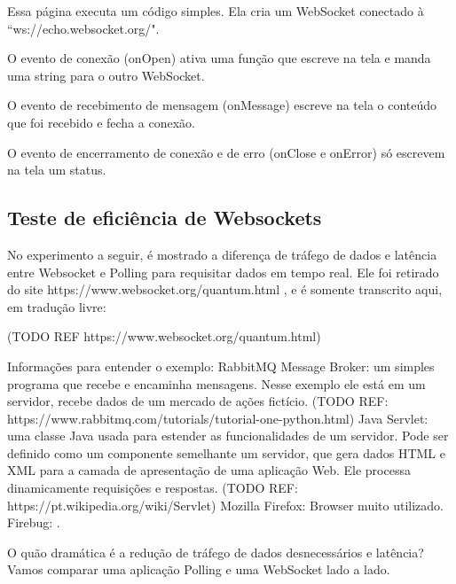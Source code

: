 \documentclass[a4paper,12pt]{article}
\begin{document}
Essa página executa um código simples. Ela cria um WebSocket conectado à “ws://echo.websocket.org/".

O evento de conexão (onOpen) ativa uma função que escreve na tela e manda uma string para o outro WebSocket.

O evento de recebimento de mensagem (onMessage) escreve na tela o conteúdo que foi recebido e fecha a conexão.

O evento de encerramento de conexão e de erro (onClose e onError) só escrevem na tela um status.





\subsection{Teste de eficiência de Websockets}


No experimento a seguir, é mostrado a diferença de tráfego de dados e latência entre Websocket e Polling para requisitar dados em tempo real. Ele foi retirado do site https://www.websocket.org/quantum.html , e é somente transcrito aqui, em tradução livre:

(TODO REF https://www.websocket.org/quantum.html)


Informações para entender o exemplo:
RabbitMQ Message Broker: um simples programa que recebe e encaminha mensagens. Nesse exemplo ele está em um servidor, recebe dados de um mercado de ações fictício. (TODO REF: https://www.rabbitmq.com/tutorials/tutorial-one-python.html)
Java Servlet: uma classe Java usada para estender as funcionalidades de um servidor. Pode ser definido como um componente semelhante um servidor, que gera dados HTML e XML para a camada de apresentação de uma aplicação Web. Ele processa dinamicamente requisições e respostas. (TODO REF: https://pt.wikipedia.org/wiki/Servlet)
Mozilla Firefox: Browser muito utilizado.
Firebug: .

O quão dramática é a redução de tráfego de dados desnecessários e latência? Vamos comparar uma aplicação Polling e uma WebSocket lado a lado.
\end{document}
